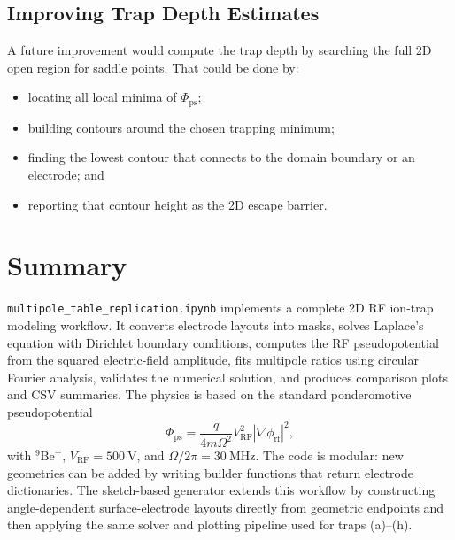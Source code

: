 \documentclass[11pt]{article}
\begin{document}
\subsection{Improving Trap Depth Estimates}

A future improvement would compute the trap depth by searching the full 2D
open region for saddle points. That could be done by:
\begin{itemize}
  \item locating all local minima of \(\Phi_{\mathrm{ps}}\);
  \item building contours around the chosen trapping minimum;
  \item finding the lowest contour that connects to the domain boundary or an
        electrode; and
  \item reporting that contour height as the 2D escape barrier.
\end{itemize}

\section{Summary}

\texttt{multipole\_table\_replication.ipynb} implements a complete 2D RF
ion-trap modeling workflow. It converts electrode layouts into masks, solves
Laplace's equation with Dirichlet boundary conditions, computes the RF
pseudopotential from the squared electric-field amplitude, fits multipole
ratios using circular Fourier analysis, validates the numerical solution, and
produces comparison plots and CSV summaries. The physics is based on the
standard ponderomotive pseudopotential
\[
  \Phi_{\mathrm{ps}}
  =
  \frac{q}{4m\Omega^2}
  V_{\mathrm{RF}}^2|\nabla\phi_{\mathrm{rf}}|^2,
\]
with \({}^{9}\mathrm{Be}^{+}\), \(V_{\mathrm{RF}}=500\ \mathrm{V}\), and
\(\Omega/2\pi=30\ \mathrm{MHz}\). The code is modular: new geometries can be
added by writing builder functions that return electrode dictionaries. The
sketch-based generator extends this workflow by constructing angle-dependent
surface-electrode layouts directly from geometric endpoints and then applying
the same solver and plotting pipeline used for traps (a)--(h).
\end{document}
